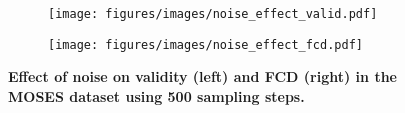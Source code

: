 \begin{figure}[h!]
    \centering
    \setlength{\abovecaptionskip}{0pt} 
    \setlength{\belowcaptionskip}{0pt}  
    
    \begin{subfigure}[b]{0.49\textwidth} 
        \centering
        \texttt{[image: figures/images/noise\_effect\_valid.pdf]}
        \label{fig:noise_effect_valid}
    \end{subfigure}
    \hfill 
    \begin{subfigure}[b]{0.49\textwidth} 
        \centering
        \texttt{[image: figures/images/noise\_effect\_fcd.pdf]}
        \label{fig:noise_effect_fcd}
    \end{subfigure}
    
    \caption{\textbf{Effect of noise on validity (left) and FCD (right) in the MOSES dataset using 500 sampling steps.}}
    \label{fig:noise_effect}
\end{figure}